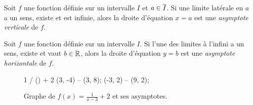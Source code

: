 \documentclass[main.tex]{subfiles}
\begin{document}
\begin{definition}

    Soit $f$ une fonction définie sur un intervalle $I$ et $a \in \overline{I}$.
    Si une limite latérale en $a$ a un sens, existe et est infinie,
    alors la droite d'équation $x = a$ est
    une \emph{asymptote verticale} de $f$.
\end{definition}

\begin{definition}

    Soit $f$ une fonction définie sur un intervalle $I$.
    Si l'une des limites à l'infini a un sens, existe et vaut $b \in \mathbb{R}$,
    alors la droite d'équation $y = b$ est
    une \emph{asymptote horizontale} de $f$.
\end{definition}

\begin{figure}
    \centering
    \begin{plot}{0.5}{-3}{-4}{9}{8}
         {1 / () + 2}
        \drawline (3, -4) -- (3, 8);
        \drawline (-3, 2) -- (9, 2);
    \end{plot}
    \caption{Graphe de $f(x) = \frac 1 {x - 3} + 2$ et ses asymptotes.}
\end{figure}
\end{document}
